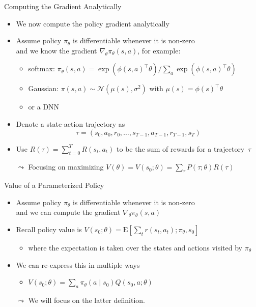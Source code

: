 \documentclass[aspectratio=169]{../latex_main/tntbeamer}  %
\begin{document}
\begin{frame}[c]{Computing the Gradient Analytically}

\begin{itemize}
	\item We now compute the policy gradient analytically
	\item Assume policy $\pi_\theta$ is differentiable whenever it is non-zero\\
	 and we know the gradient $\nabla_\theta \pi_\theta (s,a)$, for example:
	 \begin{itemize}
	     \item softmax: $\pi_\theta (s,a) = \exp(\phi(s,a)^\intercal\theta) / \sum_{a} \exp(\phi(s,a)^\intercal\theta)$
	     \item Gaussian: $\pi(s,a) \sim \mathcal{N}(\mu(s), \sigma^2)$ with $\mu(s) = \phi(s)^\intercal \theta$
	     \item or a DNN
	 \end{itemize}
	\item Denote a state-action trajectory as 
	$$ \tau = (s_0, a_0, r_0, \ldots, s_{T-1}, a_{T-1}, r_{T-1}, s_T) $$
	\item Use $R(\tau) = \sum_{t=0}^{T} R(s_t, a_t)$ to be the sum of rewards for a trajectory~$\tau$
	\item[$\leadsto$] Focusing on maximizing $V(\theta) = V(s_0; \theta) = \sum_\tau P(\tau; \theta) R(\tau)$ 
	
\end{itemize}

\end{frame}
\begin{frame}[c]{Value of a Parameterized Policy}

\begin{itemize}
	\item Assume policy $\pi_\theta$ is differentiable whenever it is non-zero\\
	 and we can compute the gradient $\nabla_\theta \pi_\theta (s,a)$
	\item Recall policy value is $V(s_0; \theta) = \mathrm{E}\left[ \sum_{t} r(s_t, a_t); \pi_\theta, s_0 \right]$
        \begin{itemize}
	   \item where the expectation is taken over the states and actions visited by $\pi_\theta$
        \end{itemize}
	\item We can re-express this in multiple ways
	\begin{itemize}
	    \item $V(s_0;\theta) = \sum_a \pi_\theta (a \mid s_0) Q(s_0, a; \theta)$
	    
	\end{itemize}
	\item[$\leadsto$] We will focus on the latter definition.
\end{itemize}

\end{frame}
\end{document}
